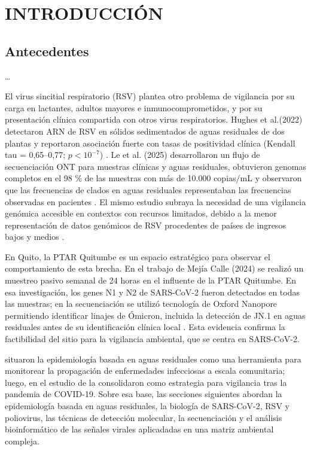 \section{INTRODUCCIÓN}

\subsection{Antecedentes}
\dots

El virus sincitial respiratorio (RSV) plantea otro problema de vigilancia por su carga en lactantes, adultos mayores e inmunocomprometidos, y por su presentación clínica compartida con otros virus respiratorios. Hughes et al.(2022) detectaron ARN de RSV en sólidos sedimentados de aguas residuales de dos plantas y reportaron asociación fuerte con tasas de positividad clínica (Kendall tau = 0,65--0,77; $p < 10^{-7}$) \cite{Hughes_2022}. Le et al. (2025) desarrollaron un flujo de secuenciación ONT para muestras clínicas y aguas residuales, obtuvieron genomas completos en el 98 \% de las muestras con más de 10.000 copias/mL y observaron que las frecuencias de clados en aguas residuales representaban las frecuencias observadas en pacientes \cite{Le_2025}. El mismo estudio subraya la necesidad de una vigilancia genómica accesible en contextos con recursos limitados, debido a la menor representación de datos genómicos de RSV procedentes de países de ingresos bajos y medios \cite{Le_2025}.

En Quito, la PTAR Quitumbe es un espacio estratégico para observar el comportamiento de esta brecha. En el trabajo de Mejía Calle (2024) se realizó un muestreo pasivo semanal de 24 horas en el influente de la PTAR Quitumbe. En esa investigación, los genes N1 y N2 de SARS-CoV-2 fueron detectados en todas las muestras; en la secuenciación se utilizó tecnología de Oxford Nanopore permitiendo identificar linajes de Ómicron, incluida la detección de JN.1 en aguas residuales antes de su identificación clínica local \cite{MejiaCalle_2024}. Esta evidencia confirma la factibilidad del sitio para la vigilancia ambiental, que se centra en SARS-CoV-2.

 situaron la epidemiología basada en aguas residuales como una herramienta para monitorear la propagación de enfermedades infecciosas a escala comunitaria; luego, en el estudio de \cite{Parkins_2023} la consolidaron como estrategia para vigilancia tras la pandemia de COVID-19. Sobre esa base, las secciones siguientes abordan la epidemiología basada en aguas residuales, la biología de SARS-CoV-2, RSV y poliovirus, las técnicas de detección molecular, la secuenciación y el análisis bioinformático de las señales virales aplicadadas en una matriz ambiental compleja.

